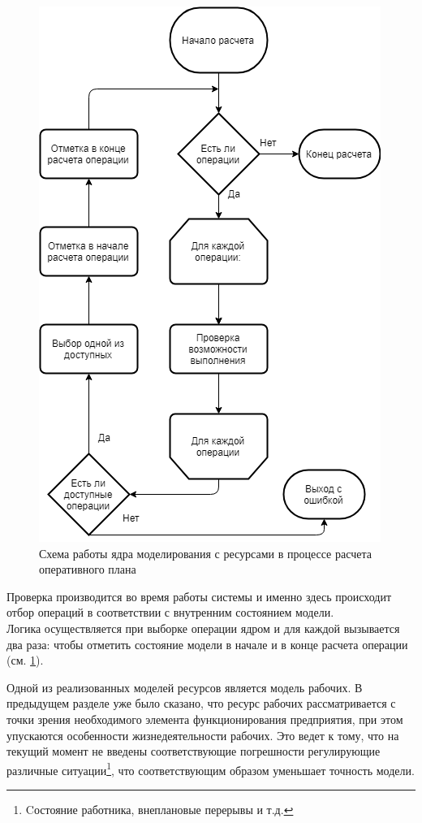 \begin{figure}[h]
	\centering
	\includegraphics[scale=0.6]{fig/assemblyResSchema.png}
	\caption{Схема работы ядра моделирования с ресурсами в процессе расчета оперативного плана}
	\label{fig:assemblyResSchema}
\end{figure}

\indent Проверка производится во время работы системы и именно здесь происходит отбор операций в соответствии с внутренним состоянием модели.\\
\indent Логика осуществляется при выборке операции ядром и для каждой вызывается два раза: чтобы отметить состояние модели в начале и в конце расчета операции (см. \ref{fig:assemblyResSchema}).


Одной из реализованных моделей ресурсов является модель рабочих. В предыдущем разделе уже было сказано, что ресурс рабочих рассматривается с точки зрения необходимого элемента функционирования предприятия, при этом упускаются особенности жизнедеятельности рабочих. Это ведет к тому, что на текущий момент не введены соответствующие погрешности регулирующие различные ситуации\footnote{Cостояние работника, внеплановые перерывы и т.д.}, что соответствующим образом уменьшает точность модели. 

